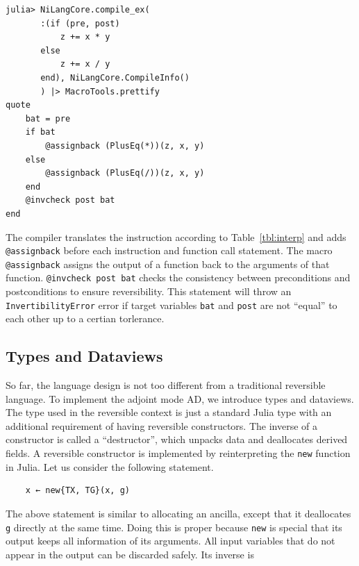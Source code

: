 \documentclass{article}
\newcommand{\<}{\langle}
\renewcommand{\>}{\rangle}
\newcommand{\Tbl}[1]{Table~\ref{#1}}
\theoremstyle{definition}\newtheorem{definition}{\textit{Definition}}
\begin{document}
\begin{minipage}{.88\columnwidth}
\begin{lstlisting}
julia> NiLangCore.compile_ex(
       :(if (pre, post)
           z += x * y
       else
           z += x / y
       end), NiLangCore.CompileInfo()
       ) |> MacroTools.prettify
quote
    bat = pre
    if bat
        @assignback (PlusEq(*))(z, x, y)
    else
        @assignback (PlusEq(/))(z, x, y)
    end
    @invcheck post bat
end
\end{lstlisting}
\end{minipage}

The compiler translates the instruction according to \Tbl{tbl:interp} and adds \texttt{@assignback} before each instruction and function call statement. The macro \texttt{@assignback} assigns the output of a function back to the arguments of that function. \texttt{@invcheck post bat} checks the consistency between preconditions and postconditions to ensure reversibility. This statement will throw an \texttt{InvertibilityError} error if target variables \texttt{bat} and \texttt{post} are not ``equal'' to each other up to a certian torlerance.

\subsection{Types and Dataviews}
So far, the language design is not too different from a traditional reversible language. To implement the adjoint mode AD, we introduce types and dataviews.
The type used in the reversible context is just a standard Julia type with an additional requirement of having reversible constructors.
The inverse of a constructor is called a ``destructor'', which unpacks data and deallocates derived fields.
A reversible constructor is implemented by reinterpreting the \texttt{new} function in Julia.
Let us consider the following statement.

\begin{minipage}{.88\columnwidth}
\begin{lstlisting}
    x ← new{TX, TG}(x, g)
\end{lstlisting}
\end{minipage}

The above statement is similar to allocating an ancilla, except that it deallocates \texttt{g} directly at the same time.
Doing this is proper because \texttt{new} is special that its output keeps all information of its arguments. All input variables that do not appear in the output can be discarded safely. Its inverse is
\end{document}
